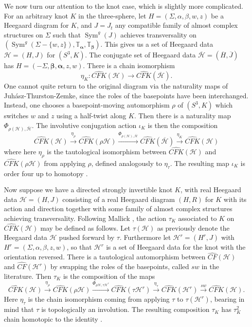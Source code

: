 \documentclass[11pt,reqno]{amsart}
\theoremstyle{definition}
\theoremstyle{remark}
\newcommand{\T}{\mathbb{T}}
\DeclareMathOperator{\Sym}{{Sym}}
\newcommand{\alphas}{\boldsymbol \alpha}
\newcommand{\betas}{\boldsymbol \beta}
\newcommand{\cH}{\mathcal{H}}
\newcommand{\CF}{\mathit{CF}}
\newcommand{\CFhat}{\widehat{\CF}}
\newcommand{\CFK}{\mathit{CFK}}
\newcommand\CFKhat{\widehat{\CFK}}
\numberwithin{equation}{section}
\newcommand\co{\colon}
\begin{document}
We now turn our attention to the knot case, which is slightly more complicated. For an arbitrary knot $K$ in the three-sphere, let $H = (\Sigma, \alpha, \beta, w, z)$ be a Heegaard diagram for $K$, and $J= J_t$ any compatible family of almost complex structures on $\Sigma$ such that $\Sym^g(J)$ achieves transversality on $(\Sym^g(\Sigma - \{w,z\}), \T_{\alphas}, \T_{\betas})$. This gives us a set of Heegaard data $\cH = (H,J)$ for $(S^3, K)$.  The conjugate set of Heegaard data $\overline{\cH} = (\overline{H}, \overline{J})$ has $H = (-\Sigma, \betas, \alphas, z, w)$. There is a chain isomorphism
%
\[ \eta_K \co \CFKhat(\cH) \rightarrow \CFKhat(\overline{\cH}).\]
%
One cannot quite return to the original diagram via the naturality maps of Juh{\'a}sz-Thurston-Zemke, since the roles of the basepoints have been interchanged. Instead, one chooses a basepoint-moving automorphism $\rho$ of $(S^3, K)$ which switches $w$ and $z$ using a half-twist along $K$. Then there is a naturality map $\Phi_{\rho(\cH), \overline{\cH}}$. The involutive conjugation action $\iota_K$ is then the composition
%
\[ \CFKhat(\cH) \xrightarrow{\eta_{\rho}} \CFKhat(\rho \cH) \xrightarrow{\Phi_{\rho(\cH), \overline{\cH}}} \CFKhat(\overline{\cH}) \xrightarrow{\eta_K} \CFKhat(\cH)\]
%
where here $\eta_{\rho}$ is the tautological isomorphism between $\CFKhat(\cH)$ and $\CFKhat(\rho \cH)$ from applying $\rho$, defined analogously to $\eta_{\tau}$. The resulting map $\iota_K$ is order four up to homotopy \cite[Section 6.1]{HMInvolutive}.

Now suppose we have a directed strongly invertible knot $K$, with real Heegaard data $\cH=(H,J)$ consisting of a real Heegaard diagram $(H,R)$ for $K$ with its action and direction together with some family of almost complex structures achieving transversality. Following Mallick \cite[Definition 6.1]{Mallick:surgery}, the action $\tau_K$ associated to $K$ on $\CFKhat(\cH)$ may be defined as follows. Let $\tau(\cH)$ as previously denote the Heegaard data $\cH$ pushed forward by $\tau$. Furthermore let $\cH^r = (H^r, J)$ with $H^r = (\Sigma, \alpha, \beta, z, w)$, so that $\cH^r$ is a set of Heegaard data for the knot with the orientation reversed. There is a tautological automorphism between $\CFhat(\cH)$ and $\CFhat(\cH^r)$ by swapping the roles of the basepoints, called $sw$ in the literature.  Then $\tau_K$ is the composition of the maps
%
\[ \CFKhat(\cH) \xrightarrow{\eta_{\rho}} \CFKhat(\rho\cH) \xrightarrow{\Phi_{\rho \cH, \tau \cH^r }} \CFKhat(\tau \cH^r) \xrightarrow {\eta_{\tau}} \CFKhat(\cH^r) \xrightarrow{sw} \CFKhat(\cH). \]
%
Here $\eta_{\tau}$ is the chain isomorphism coming from applying $\tau$ to $\tau(\cH^r)$, bearing in mind that $\tau$ is topologically an involution. The resulting composition $\tau_K$ has $\tau_K^2$ chain homotopic to the identity \cite[Section 6]{Mallick:surgery}. 
\end{document}
